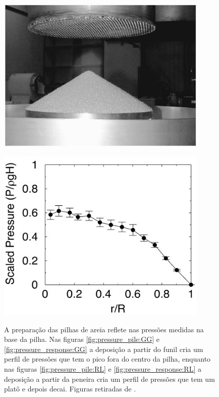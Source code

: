 \begin{figure}
\begin{minipage}{.45\linewidth}
        \includegraphics[width=0.9\textwidth]{04-figuras/Sand_Pile_RL_Experiment.png}
        \label{fig:pressure_pile:RL}
    \end{minipage}
    \begin{minipage}{.45\linewidth}
        \centering
        \includegraphics[width=0.9\textwidth]{04-figuras/Sand_Pile_RL_Pressure.png}
        \label{fig:pressure_response:RL}
    \end{minipage}
    \caption{A preparação das pilhas de areia reflete nas pressões medidas na base da pilha. Nas figuras \ref{fig:pressure_pile:GG} e \ref{fig:pressure_response:GG} a deposição a partir do funil cria um perfil de pressões que tem o pico fora do centro da pilha, enquanto nas figuras \ref{fig:pressure_pile:RL} e \ref{fig:pressure_response:RL} a deposição a partir da peneira cria um perfil de pressões que tem um platô e depois decai. Figuras retiradas de \cite{Memories_in_Sand}.}
    \label{fig:pile_stress}
\end{figure}    

